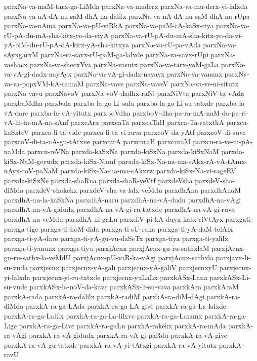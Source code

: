 {parxNa-va-maM-tarx-ga-LiMda
parxNa-va-muderx
parxNa-va-mu-derx-yi-lalxda
parxNa-va-nA-dA-nu-saM-dhA-na-dalilx
parxNa-va-nA-dA-nu-saM-dhA-na-rUpa
parxNa-va-nAma
parxNa-va-pU-viRkA
parxNa-va-paM-cA-kaSx-riya
parxNa-va-rU-pA-du-mA-sha-kitx-yo-da-viyA
parxNa-va-rU-pA-du-mA-sha-kitx-yo-da-vi-yA-biM-du-rU-pA-dA-kirx-yA-sha-kitxya
parxNa-va-rU-pa-vAda
parxNa-va-sAyxgarxM
parxNa-va-savx-rU-paM-ga-lalxde
parxNa-va-savx-rUpi
parxNa-vashacx
parxNa-va-shecxYva
parxNa-vasutx
parxNa-va-tarx-yaM-gaLa
parxNa-va-vA-gi-dadx-nayAyx
parxNa-va-vA-gi-dadx-nayayx
parxNa-va-vanunx
parxNa-va-va-popxVM-kA-ramaM
parxNa-vave
parxNa-vaveV
parxNa-va-ve-ni-situtx
parxNa-vavu
parxNavoV
parxNa-voV-dadhx-raNi
parxNiVta
parxNiV-ta-vAda
parxbaMdha
parxbala
parxba-la-go-Li-salu
parxba-la-go-Li-su-tatxde
parxba-la-vA-dare
parxba-la-vA-yitutx
parxboVdha
parxboV-dha-pa-ra-mA-naM-da-pa-ri-vA-hi-ta-mA-na-sAnf
parxcAra
parxcaTa
parxcaTaH
parxca-Ta-satxthA
parxca-kaSxteV
parxca-li-ta-vide
parxca-li-ta-vi-ruva
parxcoV-da-yAtf
parxcoV-di-suva
parxcoV-di-ta-nA-gu-tAtxne
parxcurA
parxcuraH
parxcuraM
parxcu-ra-ve-ni-pA-naMda
parxcu-reVNa
parxda-kaSxNa
parxda-kiSxNa
parxda-kiSxNaM
parxda-kiSx-NaM-geyudx
parxda-kiSx-Namf
parxda-kiSx-Na-na-ma-sAkx-rA-vA-tAmx-nAyx-roV-paNaM
parxda-kiSx-Na-na-ma-sAkxrw
parxda-kiSx-Na-vi-sageRV
parxda-kiSxNe
parxda-shaRna
parxda-shaR-yeVtf
parxdeVsha
parxdeV-sha-diMda
parxdeV-shakekx
parxdeV-sha-va-lalx-veMdu
parxdhAna
parxdhAnaM
parxdhA-na-la-kaSxNa
parxdhA-naru
parxdhA-na-vA-dudu
parxdhA-na-vAgi
parxdhA-na-vA-gidudx
parxdhA-na-vA-gi-ru-tatxde
parxdhA-na-vA-gi-ruva
parxdhA-na-veMdu
parxdhA-ni-gaLu
parxdiV-pi-kA-duyx-katx-riVtAyx
parxgati
parxga-tige
parxga-ti-hoM-dida
parxga-ti-sU-caka
parxga-ti-yA-daM-telAlx
parxga-ti-yA-dare
parxga-ti-yA-gu-vu-daSeTx
parxga-tiya
parxga-ti-yalilx
parxga-ti-yanunx
parxga-tiyu
parxjAcnx
parxjAcnx-gu-ru-sathxlaM
parxjAcnx-gu-ru-sathx-la-veMdU
parxjAcnx-pU-vaR-ka-vAgi
parxjAcnx-sathxla
parxjavx-li-su-vuda
parxjecnx
parxjecnx-yA-gali
parxjecnx-yA-galiV
parxjecnxyU
parxjecnx-yi-lalxda
parxjecnx-yi-ru-tatxde
parxjecnx-yuLaLx
parxkASx-Lana
parxkASx-Li-su-vude
parxkASx-la-noV-da-kave
parxkASx-li-su-vava
parxkAra
parxkAraM
parxkA-rada
parxkA-ra-dalilx
parxkA-radiM
parxkA-ra-diM-dAgi
parxkA-ra-diMda
parxkA-ra-ga-LAda
parxkA-ra-ga-LA-give
parxkA-ra-ga-La-lalxde
parxkA-ra-ga-Lalilx
parxkA-ra-ga-La-lilxve
parxkA-ra-ga-Lanunx
parxkA-ra-ga-Lige
parxkA-ra-ga-Live
parxkA-ra-gaLu
parxkA-rakekx
parxkA-ra-mAda
parxkA-ra-vAgi
parxkA-ra-vA-gidudx
parxkA-ra-vA-gi-paRdu
parxkA-ra-vA-give
parxkA-ra-vA-gu-tatxde
parxkA-ra-vA-yi-tAtxgi
parxkA-ra-vA-yitutx
parxkA-ravU
}
